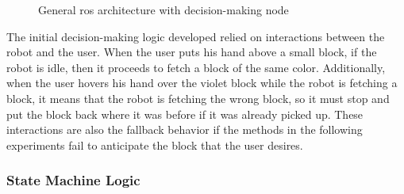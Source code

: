 \begin{figure}[ht]
    \centering
    
    \caption{General \acs{ros} architecture with decision-making node}
    \label{fig:ros_architecture}
\end{figure}

The initial decision-making logic developed relied on interactions between the robot and the user. When the user puts his hand above a small block, if the robot is idle, then it proceeds to fetch a block of the same color. Additionally, when the user hovers his hand over the violet block while the robot is fetching a block, it means that the robot is fetching the wrong block, so it must stop and put the block back where it was before if it was already picked up. These interactions are also the fallback behavior if the methods in the following experiments fail to anticipate the block that the user desires.

\subsubsection{State Machine Logic}

